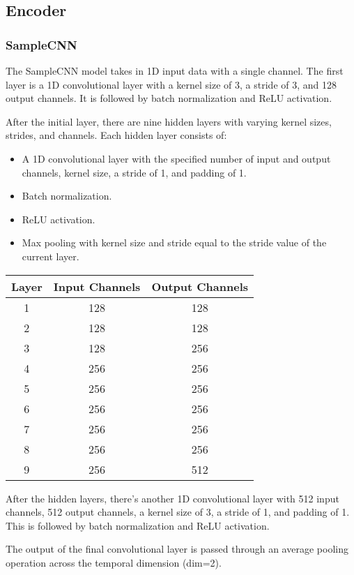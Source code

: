 \subsection{Encoder}
\subsubsection{SampleCNN}

The SampleCNN model takes in 1D input data with a single channel. The first layer is a 1D convolutional layer with a kernel size of 3, a stride of 3, and 128 output channels. It is followed by batch normalization and ReLU activation.

After the initial layer, there are nine hidden layers with varying kernel sizes, strides, and channels. Each hidden layer consists of:

\begin{itemize}
    \item A 1D convolutional layer with the specified number of input and output channels, kernel size, a stride of 1, and padding of 1.
    \item Batch normalization.
    \item ReLU activation.
    \item Max pooling with kernel size and stride equal to the stride value of the current layer.
\end{itemize}

\begin{tabular}{|c|c|c|}
\hline
\textbf{Layer} & \textbf{Input Channels} & \textbf{Output Channels} \\
\hline
1 & 128 & 128 \\
\hline
2 & 128 & 128 \\
\hline
3 & 128 & 256 \\
\hline
4 & 256 & 256 \\
\hline
5 & 256 & 256 \\
\hline
6 & 256 & 256 \\
\hline
7 & 256 & 256 \\
\hline
8 & 256 & 256 \\
\hline
9 & 256 & 512 \\
\hline
\end{tabular}

After the hidden layers, there's another 1D convolutional layer with 512 input channels, 512 output channels, a kernel size of 3, a stride of 1, and padding of 1. This is followed by batch normalization and ReLU activation.

The output of the final convolutional layer is passed through an average pooling operation across the temporal dimension (dim=2).

